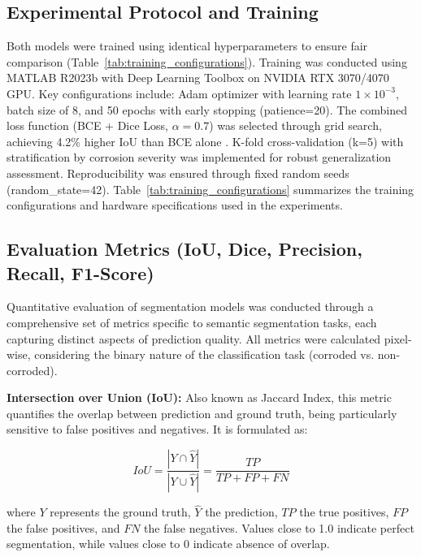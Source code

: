 \documentclass[Journal,letterpaper]{ascelike-new}
\begin{document}
\subsection{Experimental Protocol and Training}
\label{subsec:experimental_protocol}

Both models were trained using identical hyperparameters to ensure fair comparison (Table~\ref{tab:training_configurations}). Training was conducted using MATLAB R2023b with Deep Learning Toolbox on NVIDIA RTX 3070/4070 GPU. Key configurations include: Adam optimizer with learning rate $1 \times 10^{-3}$, batch size of 8, and 50 epochs with early stopping (patience=20). The combined loss function (BCE + Dice Loss, $\alpha=0.7$) was selected through grid search, achieving 4.2\% higher IoU than BCE alone \cite{sudre2017generalised,milletari2016v}. K-fold cross-validation (k=5) with stratification by corrosion severity was implemented for robust generalization assessment. Reproducibility was ensured through fixed random seeds (random\_state=42). Table~\ref{tab:training_configurations} summarizes the training configurations and hardware specifications used in the experiments.

\subsection{Evaluation Metrics (IoU, Dice, Precision, Recall, F1-Score)}
\label{subsec:metrics}

Quantitative evaluation of segmentation models was conducted through a comprehensive set of metrics specific to semantic segmentation tasks, each capturing distinct aspects of prediction quality. All metrics were calculated pixel-wise, considering the binary nature of the classification task (corroded vs. non-corroded).

\textbf{Intersection over Union (IoU):} Also known as Jaccard Index, this metric quantifies the overlap between prediction and ground truth, being particularly sensitive to false positives and negatives. It is formulated as:

\begin{equation}
IoU = \frac{|Y \cap \hat{Y}|}{|Y \cup \hat{Y}|} = \frac{TP}{TP + FP + FN}
\label{eq:iou}
\end{equation}

where $Y$ represents the ground truth, $\hat{Y}$ the prediction, $TP$ the true positives, $FP$ the false positives, and $FN$ the false negatives. Values close to 1.0 indicate perfect segmentation, while values close to 0 indicate absence of overlap.
\end{document}
